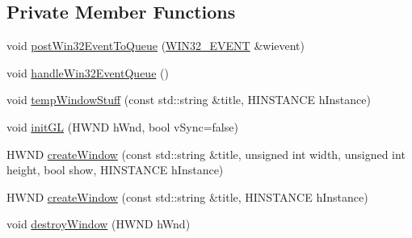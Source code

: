 \subsection*{Private Member Functions}
\begin{DoxyCompactItemize}
\item 
void \hyperlink{class_window_p_c_a18c8c102251f65235f83b733d248ed15}{post\+Win32\+Event\+To\+Queue} (\hyperlink{struct_window_p_c_1_1_w_i_n32___e_v_e_n_t}{W\+I\+N32\+\_\+\+E\+V\+E\+NT} \&wievent)
\item 
void \hyperlink{class_window_p_c_abd03ac9a2e3e653a3762374b2ed6f250}{handle\+Win32\+Event\+Queue} ()
\item 
void \hyperlink{class_window_p_c_ae90444398408f0b3e2248a1bcaf1f87f}{temp\+Window\+Stuff} (const std\+::string \&title, H\+I\+N\+S\+T\+A\+N\+CE h\+Instance)
\item 
void \hyperlink{class_window_p_c_aa3d6fac4c045f2eaf5caa0a73bc8f8b5}{init\+GL} (H\+W\+ND h\+Wnd, bool v\+Sync=false)
\item 
H\+W\+ND \hyperlink{class_window_p_c_abefc415a2ebea795117000822c1d4c6f}{create\+Window} (const std\+::string \&title, unsigned int width, unsigned int height, bool show, H\+I\+N\+S\+T\+A\+N\+CE h\+Instance)
\item 
H\+W\+ND \hyperlink{class_window_p_c_aafe0e02b17a2e11418d9957e7f2aaae9}{create\+Window} (const std\+::string \&title, H\+I\+N\+S\+T\+A\+N\+CE h\+Instance)
\item 
void \hyperlink{class_window_p_c_a2f3d974dc86bee64deeec258ec0bf548}{destroy\+Window} (H\+W\+ND h\+Wnd)
\end{DoxyCompactItemize}
